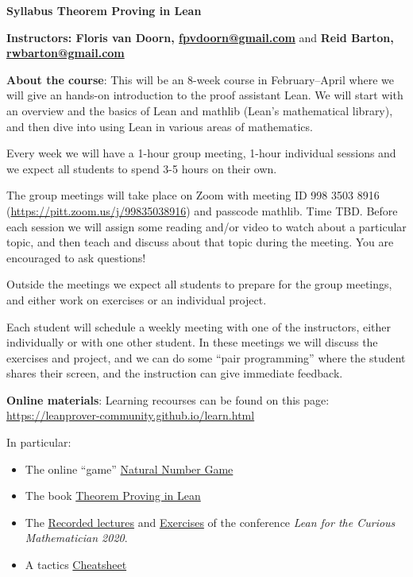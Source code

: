 \documentclass[10pt]{article}
\begin{document}
\mbox{}\vspace*{-15mm}
\begin{center}
{\large\bf Syllabus Theorem Proving in Lean}

{\bf Instructors: Floris van Doorn, \url{fpvdoorn@gmail.com}} and {\bf Reid Barton, \url{rwbarton@gmail.com }}
\end{center}

\textbf{About the course}:
This will be an 8-week course in February--April where we will give an hands-on introduction to the proof assistant Lean. We will start with an overview and the basics of Lean and \textsf{mathlib} (Lean's mathematical library), and then dive into using Lean in various areas of mathematics.

Every week we will have a 1-hour group meeting, 1-hour individual sessions and we expect all students to spend 3-5 hours on their own.

The group meetings will take place on Zoom with meeting ID 998 3503 8916 (\url{https://pitt.zoom.us/j/99835038916}) and passcode \textsf{mathlib}. Time TBD. Before each session we will assign some reading and/or video to watch about a particular topic, and then teach and discuss about that topic during the meeting. You are encouraged to ask questions!

Outside the meetings we expect all students to prepare for the group meetings, and either work on exercises or an individual project.

Each student will schedule a weekly meeting with one of the instructors, either individually or with one other student. In these meetings we will discuss the exercises and project, and we can do some ``pair programming'' where the student shares their screen, and the instruction can give immediate feedback.

\textbf{Online materials}:
Learning recourses can be found on this page: \url{https://leanprover-community.github.io/learn.html}

In particular:
\begin{itemize}
\item The online ``game'' \href{http://wwwf.imperial.ac.uk/~buzzard/xena/natural_number_game/}{Natural Number Game}
\item The book \href{https://leanprover.github.io/theorem_proving_in_lean/}{Theorem Proving in Lean}
\item The \href{https://www.youtube.com/playlist?list=PLlF-CfQhukNlxexiNJErGJd2dte_J1t1N}{Recorded lectures} and \href{https://leanprover-community.github.io/lftcm2020/exercises.html}{Exercises} of the conference \emph{Lean for the Curious Mathematician 2020}.
\item A tactics \href{https://leanprover-community.github.io//img/lean-tactics.pdf}{Cheatsheet}
\end{itemize}
\end{document}
